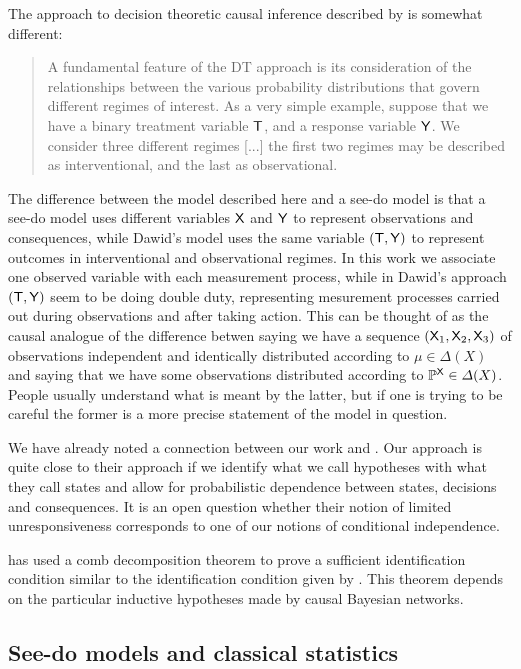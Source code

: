 The approach to decision theoretic causal inference described by \citet{dawid_decision-theoretic_2020} is somewhat different:

\begin{quote}
A fundamental feature of the DT approach is its consideration of the relationships between the various probability distributions that govern different regimes of interest. As a very simple example, suppose that we have a binary treatment variable $\mathsf{T}$, and a response variable $\mathsf{Y}$. We consider three different regimes [...] the first two regimes may be described as interventional, and the last as observational.
\end{quote}

The difference between the model described here and a see-do model is that a see-do model uses different variables $\mathsf{X}$ and $\mathsf{Y}$ to represent observations and consequences, while Dawid's model uses the same variable $(\mathsf{T},\mathsf{Y})$ to represent outcomes in interventional and observational regimes. In this work we associate one observed variable with each measurement process, while in Dawid's approach $(\mathsf{T},\mathsf{Y})$ seem to be doing double duty, representing mesurement processes carried out during observations and after taking action. This can be thought of as the causal analogue of the difference betwen saying we have a sequence $(\mathsf{X}_1,\mathsf{X}_2,\mathsf{X}_3)$ of observations independent and identically distributed according to $\mu\in \Delta(X)$ and saying that we have some observations distributed according to $\mathbb{P}^{\mathsf{X}}\in \Delta(X)$. People usually understand what is meant by the latter, but if one is trying to be careful the former is a more precise statement of the model in question.

We have already noted a connection between our work and \citet{heckerman_decision-theoretic_1995}. Our approach is quite close to their approach if we identify what we call hypotheses with what they call states and allow for probabilistic dependence between states, decisions and consequences. It is an open question whether their notion of limited unresponsiveness corresponds to one of our notions of conditional independence.

\citet{jacobs_causal_2019} has used a comb decomposition theorem to prove a sufficient identification condition similar to the identification condition given by \citet{tian2002general}. This theorem depends on the particular inductive hypotheses made by causal Bayesian networks.

\subsection{See-do models and classical statistics}

